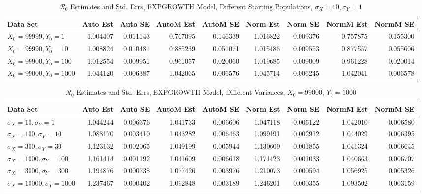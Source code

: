 \documentclass[12pt]{article}
\newcommand{\rr}{\ensuremath{\mathcal{R}_0}}
\begin{document}
\begin{table}[H]
	
	\caption{$\rr$ Estimates and Std. Errs, EXPGROWTH Model,
		Different Starting Populations, 
		$\sigma_X = 10, \sigma_Y = 1$}
	\begin{footnotesize}
		\hskip -1.7cm
		\begin{tabular}{l|r|r|r|r|r|r|r|r}
			Data Set & Auto Est & Auto SE & AutoM Est & AutoM SE & Norm Est & Norm SE & NormM Est & NormM SE\\
			\hline
			$X_0 = 99999, Y_0 = 1$ & 1.004407 & 0.011143 & 0.767095 & 0.146339 & 1.016822 & 0.009376 & 0.757875 & 0.155300\\
			\hline
			$X_0 = 99990, Y_0 = 10$ & 1.008824 & 0.010481 & 0.885239 & 0.051071 & 1.015486 & 0.009553 & 0.877557 & 0.055606\\
			\hline
			$X_0 = 99900, Y_0 = 100$ & 1.012554 & 0.009951 & 0.961057 & 0.020060 & 1.019685 & 0.009009 & 0.961228 & 0.020014\\
			\hline
			$X_0 = 99000, Y_0 = 1000$ & 1.044120 & 0.006387 & 1.042065 & 0.006576 & 1.045714 & 0.006245 & 1.042041 & 0.006578\\
			\hline
		\end{tabular}
	\end{footnotesize}
\end{table}

\begin{table}[H]
	
	\caption{$\rr$ Estimates and Std. Errs, EXPGROWTH Model, 
		Different Variances, $X_0 = 99000$, $Y_0 = 1000$}
	\begin{footnotesize}
		\hskip -1.7cm
		\begin{tabular}{l|r|r|r|r|r|r|r|r}
			\hline
			Data Set & Auto Est & Auto SE & AutoM Est & AutoM SE & Norm Est & Norm SE & NormM Est & NormM SE\\
			\hline
			$\sigma_X = 10, \sigma_Y = 1$ & 1.044244 & 0.006376 & 1.041733 & 0.006606 & 1.047118 & 0.006122 & 1.042010 & 0.006580\\
			\hline
			$\sigma_X = 100, \sigma_Y = 10$ & 1.088170 & 0.003410 & 1.043282 & 0.006463 & 1.099191 & 0.002912 & 1.044029 & 0.006395\\
			\hline
			$\sigma_X = 300, \sigma_Y = 30$ & 1.123132 & 0.002065 & 1.049199 & 0.005944 & 1.130609 & 0.001855 & 1.041324 & 0.006645\\
			\hline
			$\sigma_X = 1000, \sigma_Y = 100$ & 1.161414 & 0.001192 & 1.041609 & 0.006618 & 1.171423 & 0.001033 & 1.040663 & 0.006707\\
			\hline
			$\sigma_X = 3000, \sigma_Y = 300$ & 1.194876 & 0.000738 & 1.077426 & 0.003976 & 1.210073 & 0.000594 & 1.056925 & 0.005326\\
			\hline
			$\sigma_X = 10000, \sigma_Y = 1000$ & 1.237467 & 0.000402 & 1.092848 & 0.003189 & 1.246201 & 0.000355 & 1.093502 & 0.003159\\
			\hline
		\end{tabular}
	\end{footnotesize}
\end{table}
\end{document}
